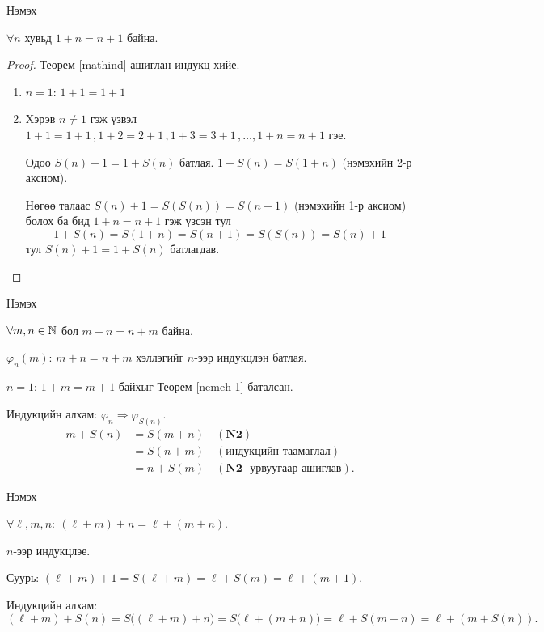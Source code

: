 \begin{frame}[allowframebreaks]{Нэмэх}
\begin{theorem}\label{nemeh 1}
$\forall n$ хувьд $1+n=n+1$ байна.
\end{theorem}
\begin{proof}
Теорем \ref{mathind} ашиглан индукц хийе. 
\begin{enumerate}
    \item $n=1$: $1+1=1+1$ 
    \item Xэрэв $n\neq 1 $ гэж үзвэл $1+1=1+1 \, , 1+2=2+1 \, , 1+3=3+1 \, , \ldots ,  1+n=n+1 $ гэе. 
    
    Одоо $S(n)+1=1+S(n)$ батлая. $1+S(n)=S(1+n)$ (нэмэхийн 2-р аксиом). 
    
    Нөгөө талаас $S(n)+1=S(S(n))=S(n+1)$ (нэмэхийн 1-р аксиом) болох ба бид $ 1+n=n+1 $ гэж үзсэн тул  $$1+S(n)=S(1+n)=S(n+1)=S(S(n))=S(n)+1$$ тул 
    $S(n)+1=1+S(n)$ батлагдав.
    \qedhere
\end{enumerate}  
\end{proof}
\end{frame}

\begin{frame}[allowframebreaks]{Нэмэх}
\begin{theorem}
$\forall m,n\in\mathbb{N}$ бол $ m+n=n+m$ байна.
\end{theorem}
\begin{prof}
$\varphi_n(m):\, m+n=n+m$ хэллэгийг $n$-ээр индукцлэн батлая. 

$n=1$: $1+m=m+1$ байхыг Теорем \ref{nemeh 1} баталсан. 

Индукцийн алхам: $\varphi_n\Rightarrow\varphi_{S(n)}$.
\begin{align*}
 m+S(n)&=S(m+n)\quad(\textbf{N2})\\
           &=S(n+m)\quad(\text{индукцийн таамаглал})\\
           &=n+S(m)\quad(\textbf{N2 }\text{ урвуугаар ашиглав}).
\end{align*}
\end{prof}
\end{frame}

\begin{frame}[allowframebreaks]{Нэмэх}
\begin{theorem}
$\forall \ell,m,n:\ (\ell+m)+n=\ell+(m+n)$.
\end{theorem}
\begin{prof}
$n$-ээр индукцлэе. 

Суурь: $(\ell+m)+1=S(\ell+m)=\ell+S(m)=\ell+(m+1).$ 

Индукцийн алхам:
\[(\ell+m)+S(n)=S\big((\ell+m)+n\big)=S\big(\ell+(m+n)\big)=\ell+S(m+n)=\ell+(m+S(n)).\]
\end{prof}
\end{frame}

